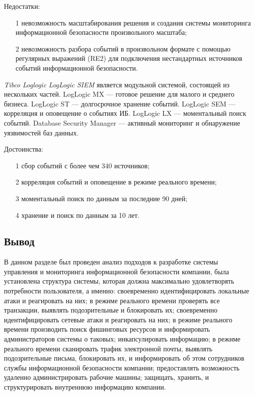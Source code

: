 Недостатки:
\begin{enumerate}
    \item [1]невозможность масштабирования решения и создания системы мониторинга информационной безопасности произвольного масштаба;
    \item [2]невозможность разбора событий в произвольном формате с помощью регулярных выражений (RE2) для подключения нестандартных источников событий информационной безопасности.
\end{enumerate}

\textit{Tibco Loglogic LogLogic SIEM} является модульной системой, состоящей из нескольких частей. LogLogic MX --- готовое решение для малого и среднего бизнеса. LogLogic ST --- долгосрочное хранение событий. LogLogic SEM --- корреляция и оповещение о событиях ИБ. LogLogic LX --- моментальный поиск событий. Database Security Manager ---  активный мониторинг и обнаружение уязвимостей баз данных.

Достоинства:

\begin{enumerate}

    \item [1]сбор событий с более чем 340 источников;
    \item [2]корреляция событий и оповещение в режиме реального времени;
    \item [3]моментальный поиск по данным за последние 90 дней;
    \item [4]хранение и поиск по данным за 10 лет.
\end{enumerate}

\subsection{Вывод}
В данном разделе был проведен анализ подходов к разработке системы управления и мониторинга информационной безопасности компании, была установлена структура системы, которая должна максимально удовлетворять потребности пользователя, а именно: своевременно идентифицировать локальные атаки и реагировать на них; в режиме реального времени проверять все транзакции, выявлять подозрительные и блокировать их; своевременно идентифицировать сетевые атаки и реагировать на них; в режиме реального времени производить поиск фишинговых ресурсов и информировать администраторов системы о таковых; инкапсулировать информацию; в режиме реального времени сканировать трафик электронной почты, выявлять подозрительные письма, блокировать их, и информировать об этом сотрудников службы информационной безопасности компании; предоставлять возможность удаленно администрировать рабочие
машины; защищать, хранить, и структурировать внутреннюю информацию
компании.